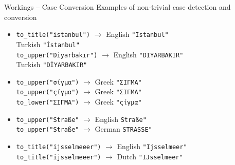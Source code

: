 \documentclass{beamer}
\begin{document}
\begin{frame}{Workings – Case Conversion}
Examples of non-trivial case detection and conversion
\begin{itemize}
\item \texttt{to\_title("\alert{i}stanbul")} $\rightarrow$ \hfill English \texttt{"\alert{I}stanbul"}\\
\hfill Turkish \texttt{"\alert{İ}stanbul"}\\
\texttt{to\_upper("D\alert{i}yarbak\alert{ı}r")} $\rightarrow$ \hfill English \texttt{"D\alert{I}YARBAK\alert{I}R"}\\
\hfill Turkish \texttt{"D\alert{İ}YARBAK\alert{I}R"}\\
\item \texttt{to\_upper("{\alert{σ}ίγμα}")} $\rightarrow$ \hfill Greek \texttt{"{\alert{Σ}ΙΓΜΑ}"}\\
\texttt{to\_upper("{\alert{ς}ίγμα}")} $\rightarrow$ \hfill Greek \texttt{"{\alert{Σ}ΙΓΜΑ}"}\\
\texttt{to\_lower("{\alert{Σ}ΙΓΜΑ}")} $\rightarrow$ \hfill Greek \texttt{"{\alert{ς}ίγμα}"}\\
\item \texttt{to\_upper("Stra\alert{ß}e"} $\rightarrow$ \hfill English \texttt{Stra\alert{ß}e"}\\
\texttt{to\_upper("Stra\alert{ß}e"} $\rightarrow$ \hfill German \texttt{STRA\alert{SS}E"}
\item \texttt{to\_title("\alert{ij}sselmeeer")} $\rightarrow$ \hfill English \texttt{"\alert{Ij}sselmeer"}\\
\texttt{to\_title("\alert{ij}sselmeeer")} $\rightarrow$ \hfill Dutch \texttt{"\alert{IJ}sselmeer"}
\end{itemize}
\end{frame}
\end{document}
